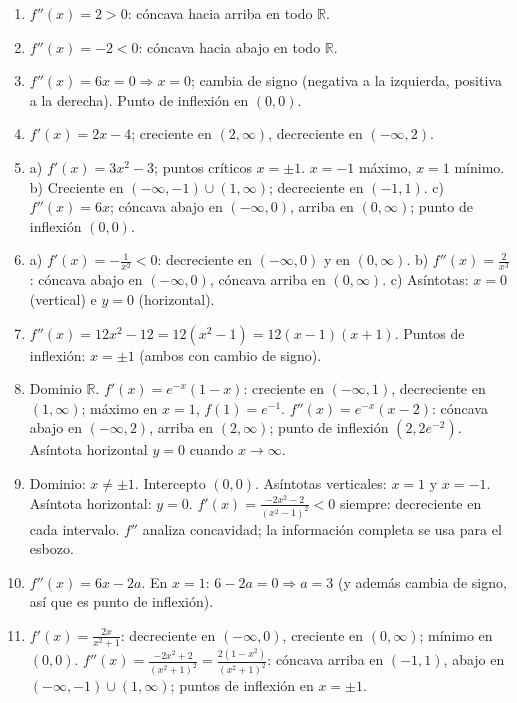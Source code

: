 \documentclass[12pt, letterpaper]{article}
\begin{document}
  \begin{enumerate}[resume=respuestas, leftmargin=*, label=\textbf{\arabic*.}]
    \item $f''(x) = 2 > 0$: cóncava hacia arriba en todo $\mathbb{R}$.
    \item $f''(x) = -2 < 0$: cóncava hacia abajo en todo $\mathbb{R}$.
    \item $f''(x) = 6x = 0 \Rightarrow x = 0$; cambia de signo (negativa a la izquierda, positiva a la derecha). Punto de inflexión en $(0, 0)$.
    \item $f'(x) = 2x - 4$; creciente en $(2, \infty)$, decreciente en $(-\infty, 2)$.
    \item a) $f'(x) = 3x^2 - 3$; puntos críticos $x = \pm 1$. $x = -1$ máximo, $x = 1$ mínimo. b) Creciente en $(-\infty, -1) \cup (1, \infty)$; decreciente en $(-1, 1)$. c) $f''(x) = 6x$; cóncava abajo en $(-\infty, 0)$, arriba en $(0, \infty)$; punto de inflexión $(0, 0)$.
    \item a) $f'(x) = -\frac{1}{x^2} < 0$: decreciente en $(-\infty, 0)$ y en $(0, \infty)$. b) $f''(x) = \frac{2}{x^3}$: cóncava abajo en $(-\infty, 0)$, cóncava arriba en $(0, \infty)$. c) Asíntotas: $x = 0$ (vertical) e $y = 0$ (horizontal).
    \item $f''(x) = 12x^2 - 12 = 12(x^2 - 1) = 12(x - 1)(x + 1)$. Puntos de inflexión: $x = \pm 1$ (ambos con cambio de signo).
    \item Dominio $\mathbb{R}$. $f'(x) = e^{-x}(1 - x)$: creciente en $(-\infty, 1)$, decreciente en $(1, \infty)$; máximo en $x = 1$, $f(1) = e^{-1}$. $f''(x) = e^{-x}(x - 2)$: cóncava abajo en $(-\infty, 2)$, arriba en $(2, \infty)$; punto de inflexión $(2, 2e^{-2})$. Asíntota horizontal $y = 0$ cuando $x \to \infty$.
    \item Dominio: $x \neq \pm 1$. Intercepto $(0, 0)$. Asíntotas verticales: $x = 1$ y $x = -1$. Asíntota horizontal: $y = 0$. $f'(x) = \frac{-2x^2 - 2}{(x^2 - 1)^2} < 0$ siempre: decreciente en cada intervalo. $f''$ analiza concavidad; la información completa se usa para el esbozo.
    \item $f''(x) = 6x - 2a$. En $x = 1$: $6 - 2a = 0 \Rightarrow a = 3$ (y además cambia de signo, así que es punto de inflexión).
    \item $f'(x) = \frac{2x}{x^2 + 1}$: decreciente en $(-\infty, 0)$, creciente en $(0, \infty)$; mínimo en $(0, 0)$. $f''(x) = \frac{-2x^2 + 2}{(x^2 + 1)^2} = \frac{2(1 - x^2)}{(x^2 + 1)^2}$: cóncava arriba en $(-1, 1)$, abajo en $(-\infty, -1) \cup (1, \infty)$; puntos de inflexión en $x = \pm 1$.
  \end{enumerate}
\end{document}
